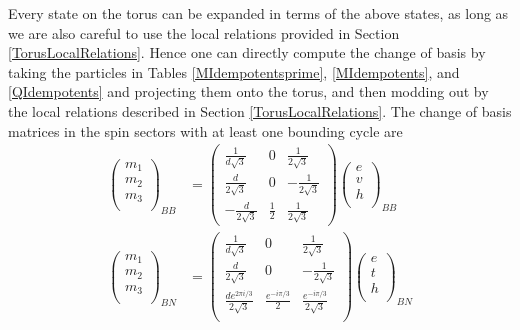 Every state on the torus can be expanded in terms of the above states, as long 
as we are also careful to use the local relations provided in Section \ref{TorusLocalRelations}.
Hence one can directly compute the change of basis by taking the particles in 
Tables \ref{MIdempotentsprime}, \ref{MIdempotents},  and \ref{QIdempotents} and 
projecting them onto the torus, and then modding out by the local relations described in Section \ref{TorusLocalRelations}.
The change of basis matrices in the spin sectors with at least one bounding cycle are 
\begin{align}
\label{VAA}
\left( \begin{matrix}
{m}_1\\
{m}_2\\
{m}_3\\
\end{matrix} \right)_{BB} 
&= \left( \begin{matrix}
\frac{1}{d\sqrt{3}} & 0 & \frac{1}{2 \sqrt{3}} \\
\frac{d}{2 \sqrt{3}} & 0 & - \frac{1}{2 \sqrt{3}} \\
- \frac{d}{2 \sqrt{3}} & \frac{1}{2} & \frac{1}{2 \sqrt{3}}
\end{matrix} \right)
\left( \begin{matrix}
e\\
v\\
h\\
\end{matrix} \right)_{BB}\\
\label{VAP}  
\left( \begin{matrix}
{m}_1\\
{m}_2\\
{m}_3\\
\end{matrix} \right)_{BN}
&= \left( \begin{matrix}
\frac{1}{d\sqrt{3}} & 0 & \frac{1}{2 \sqrt{3}} \\
\frac{d}{2 \sqrt{3}} & 0 & - \frac{1}{2 \sqrt{3}} \\
\frac{d e^{2 \pi i/3}}{2 \sqrt{3}} & \frac{e^{- i \pi /3}}{2} & \frac{e^{- i \pi /3}}{2 \sqrt{3}}\\
\end{matrix} \right)
\left( \begin{matrix}
e\\
t\\
h\\
\end{matrix} \right)_{BN} \\
\label{VPA} 

\end{align}
